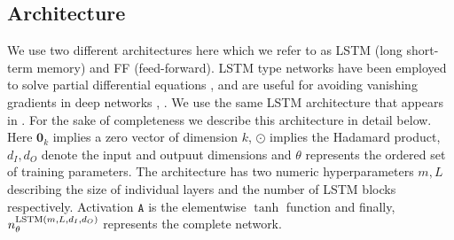 \subsection{Architecture} \label{ssec-arch--var-ml}
We use two different architectures here which we refer to as LSTM (long short-term memory) and FF (feed-forward). LSTM type networks have been employed to solve partial differential equations \cite{sirignano2018dgm}, \cite{mandal2023learning} and are useful for avoiding vanishing gradients in deep networks \cite{sherstinsky2020fundamentals}, \cite{vennerod2021long}. We use the same LSTM architecture that appears in \cite{mandal2023learning}. For the sake of completeness we describe this architecture in detail below. Here $\mathbf 0_k$ implies a zero vector of dimension $k$, $\odot$ implies the Hadamard product, $d_I, d_O$ denote the input and outpuut dimensions and $\theta$ represents the ordered set of training parameters. The architecture has two numeric hyperparameters $m, L$ describing the size of individual layers and the number of LSTM blocks respectively. Activation $\mathtt A$ is the elementwise $\tanh$ function and finally, $n^{{\rm LSTM}(m, L, d_I, d_O)}_\theta$ represents the complete network.


